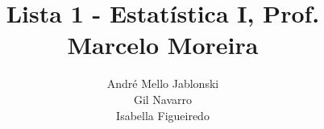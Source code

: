 \documentclass[10pt]{article}
\begin{document}
\title{Lista 1 - Estatística I, Prof. Marcelo Moreira}
\author{André Mello Jablonski \\ Gil Navarro \\ Isabella Figueiredo}

\date{}
\maketitle
\end{document}
